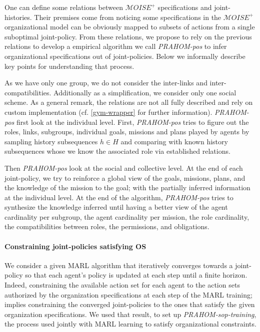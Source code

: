\documentclass[runningheads]{llncs}
\newcounter{relation}
\begin{document}
One can define some relations between $\mathcal{M}OISE^+$ specifications and joint-histories. Their premises come from noticing some specifications in the $\mathcal{M}OISE^+$ organizational model can be obviously mapped to subsets of actions from a single suboptimal joint-policy.
From these relations, we propose to rely on the previous relations to develop a empirical algorithm we call \emph{PRAHOM-pos} to infer organizational specifications out of joint-policies. Below we informally describe key points for understanding that process.

As we have only one group, we do not consider the inter-links and inter-compatibilities. Additionally as a simplification, we consider only one social scheme. As a general remark, the  relations are not all fully described and rely on custom implementation (cf. \autoref{gym-wrapper} for further information).
\emph{PRAHOM-pos} first look at the individual level.
First, \emph{PRAHOM-pos} tries to figure out the roles, links, subgroups, individual goals, missions and plans played by agents by sampling history subsequences $h \in H$ and comparing with known history subsequences whose we know the associated role via established relations.

Then \emph{PRAHOM-pos} look at the social and collective level.
At the end of each joint-policy, we try to reinforce a global view of the goals, missions, plans, and the knowledge of the mission to the goal; with the partially inferred information at the individual level.
At the end of the algorithm, \emph{PRAHOM-pos} tries to synthesize the knowledge inferred until having a better view of the agent cardinality per subgroup, the agent cardinality per mission, the role cardinality, the compatibilities between roles, the permissions, and obligations.

\paragraph{\textbf{Constraining joint-policies satisfying OS}}

We consider a given MARL algorithm that iteratively converges towards a joint-policy so that each agent's policy is updated at each step until a finite horizon. Indeed, constraining the available action set for each agent to the action sets authorized by the organization specifications at each step of the MARL training; implies constraining the converged joint-policies to the ones that satisfy the given organization specifications. We used that result, to set up \emph{PRAHOM-sop-training}, the process used jointly with MARL learning to satisfy organizational constraints.
\end{document}
